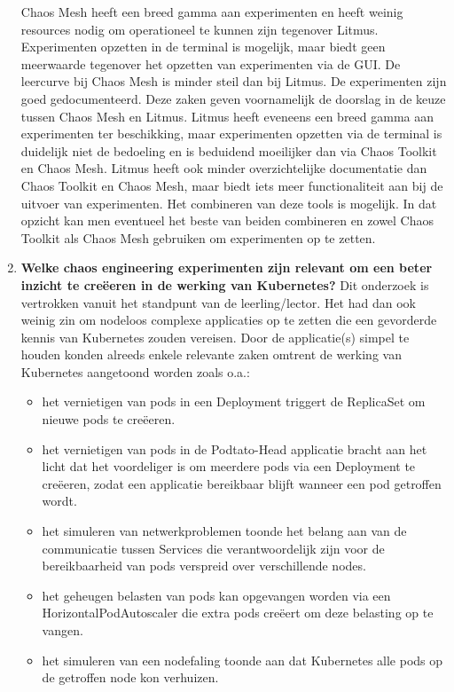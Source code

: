 \begin{enumerate}
\newline Chaos Mesh heeft een breed gamma aan experimenten en heeft weinig resources nodig om operationeel te kunnen zijn tegenover Litmus. Experimenten opzetten in de terminal is mogelijk, maar biedt geen meerwaarde tegenover het opzetten van experimenten via de GUI. De leercurve bij Chaos Mesh is minder steil dan bij Litmus. De experimenten zijn goed gedocumenteerd. Deze zaken geven voornamelijk de doorslag in de keuze tussen Chaos Mesh en Litmus.    
\newline Litmus heeft eveneens een breed gamma aan experimenten ter beschikking, maar experimenten opzetten via de terminal is duidelijk niet de bedoeling en is beduidend moeilijker dan via Chaos Toolkit en Chaos Mesh. Litmus heeft ook minder overzichtelijke documentatie dan Chaos Toolkit en Chaos Mesh, maar biedt iets meer functionaliteit aan bij de uitvoer van experimenten. 
\newline Het combineren van deze tools is mogelijk. In dat opzicht kan men eventueel het beste van beiden combineren en zowel Chaos Toolkit als Chaos Mesh gebruiken om experimenten op te zetten.   
\newline 
\item {\bf Welke chaos engineering experimenten zijn relevant om een beter inzicht te creëeren in de werking van Kubernetes?}  
\newline Dit onderzoek is vertrokken vanuit het standpunt van de leerling/lector. Het had dan ook weinig zin om nodeloos complexe applicaties op te zetten die een gevorderde kennis van Kubernetes zouden vereisen. Door de applicatie(s) simpel te houden konden alreeds enkele relevante zaken omtrent de werking van Kubernetes aangetoond worden zoals o.a.: 
\begin{itemize}
    \item het vernietigen van pods in een Deployment triggert de ReplicaSet om nieuwe pods te creëeren.
    \item het vernietigen van pods in de Podtato-Head applicatie bracht aan het licht dat het voordeliger is om meerdere pods via een Deployment te creëeren, zodat een applicatie bereikbaar blijft wanneer een pod getroffen wordt.
    \item het simuleren van netwerkproblemen toonde het belang aan van de communicatie tussen Services die verantwoordelijk zijn voor de bereikbaarheid van pods verspreid over verschillende nodes.      
    \item het geheugen belasten van pods kan opgevangen worden via een HorizontalPodAutoscaler die extra pods creëert om deze belasting op te vangen.
    \item het simuleren van een nodefaling toonde aan dat Kubernetes alle pods op de getroffen node kon verhuizen. 
\end{itemize} 
\end{enumerate}